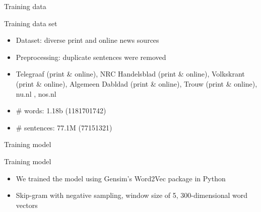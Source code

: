 \documentclass[compress]{beamer}
\begin{document}
%
%
%
%

\begin{frame}{Training data}
	\begin{block}{Training data set}
		\begin{itemize}
			\item Dataset: diverse print and online news sources
			\item Preprocessing: duplicate sentences were removed
			\item Telegraaf (print \& online), NRC Handelsblad (print \& online), Volkskrant (print \& online), Algemeen Dabldad (print \& online), Trouw (print \& online), nu.nl , nos.nl
			\item \# words: 1.18b (1181701742)
			\item \# sentences: 77.1M (77151321)
		\end{itemize}
	\end{block}
\end{frame}

\begin{frame}{Training model}
	\begin{block}{Training model}
		\begin{itemize}
			\item We trained the model using Gensim's Word2Vec package in Python
			\item Skip-gram with negative sampling, window size of 5, 300-dimensional word vectors
		\end{itemize}
	\end{block}
\end{frame}
\end{document}
